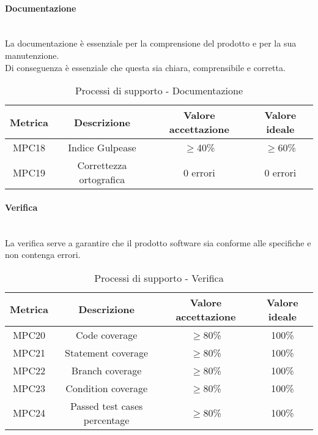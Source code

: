\documentclass[11pt]{article}
\begin{document}
\begin{justify}
\paragraph{Documentazione}\mbox{}\\
La documentazione è essenziale per la comprensione del prodotto e per la sua manutenzione.\\
Di conseguenza è essenziale che questa sia chiara, comprensibile e corretta.\\
\begin{table}[H]
  \centering
\begin{tabular}{|c|c|c|c|}
  \hline
  \textbf{Metrica} & \textbf{Descrizione} & \textbf{Valore accettazione} & \textbf{Valore ideale}\\
  \hline
  MPC18 & Indice Gulpease & $\geq$40\% & $\geq$60\% \\
  \hline
  MPC19 & Correttezza ortografica & 0 errori & 0 errori \\
  \hline
\end{tabular}
\caption{Processi di supporto - Documentazione}
\label{tab:documentazione}
\end{table}

\paragraph{Verifica}\mbox{}\\
La verifica serve a garantire che il prodotto software sia conforme alle specifiche e non contenga errori.\\
\begin{table}[H]
  \centering
\begin{tabular}{|c|c|c|c|}
  \hline
  \textbf{Metrica} & \textbf{Descrizione} & \textbf{Valore accettazione} & \textbf{Valore ideale}\\
  \hline
  MPC20 & Code coverage & $\geq$80\% & 100\% \\
  \hline
  MPC21 & Statement coverage & $\geq$80\% & 100\% \\
  \hline
  MPC22 & Branch coverage & $\geq$80\% & 100\% \\
  \hline
  MPC23 & Condition coverage & $\geq$80\% & 100\% \\
  \hline
  MPC24 & Passed test cases percentage & $\geq$80\% & 100\% \\
  \hline
\end{tabular}
\caption{Processi di supporto - Verifica}
\label{tab:verifica}
\end{table}


\end{justify}
\end{document}
